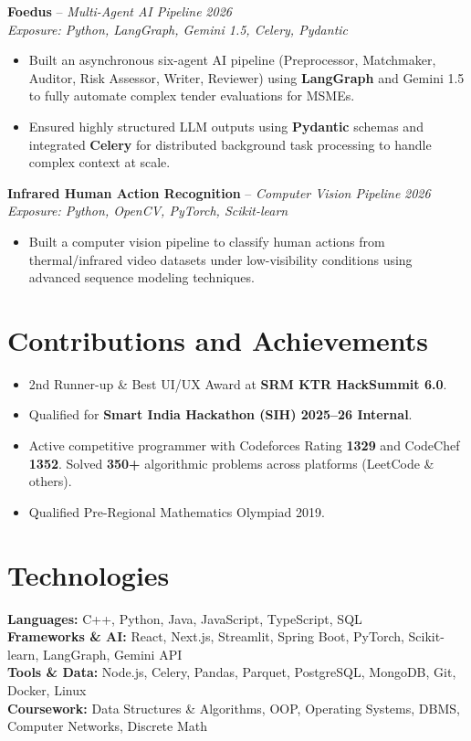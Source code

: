 \documentclass[10pt,a4paper]{article}
\begin{document}
\noindent\textbf{Foedus} -- \textit{Multi-Agent AI Pipeline} \hfill \textit{2026} \\
\textit{Exposure: Python, LangGraph, Gemini 1.5, Celery, Pydantic}
\begin{itemize}
    \item \small Built an asynchronous six-agent AI pipeline (Preprocessor, Matchmaker, Auditor, Risk Assessor, Writer, Reviewer) using \textbf{LangGraph} and Gemini 1.5 to fully automate complex tender evaluations for MSMEs.
    \item \small Ensured highly structured LLM outputs using \textbf{Pydantic} schemas and integrated \textbf{Celery} for distributed background task processing to handle complex context at scale.
\end{itemize}

\noindent\textbf{Infrared Human Action Recognition} -- \textit{Computer Vision Pipeline} \hfill \textit{2026} \\
\textit{Exposure: Python, OpenCV, PyTorch, Scikit-learn}
\begin{itemize}
    \item \small Built a computer vision pipeline to classify human actions from thermal/infrared video datasets under low-visibility conditions using advanced sequence modeling techniques.
\end{itemize}

\section*{Contributions and Achievements}
\begin{itemize}
    \item \small 2nd Runner-up \& Best UI/UX Award at \textbf{SRM KTR HackSummit 6.0}.
    \item \small Qualified for \textbf{Smart India Hackathon (SIH) 2025–26 Internal}.
    \item \small Active competitive programmer with Codeforces Rating \textbf{1329} and CodeChef \textbf{1352}. Solved \textbf{350+} algorithmic problems across platforms (LeetCode \& others).
    \item \small Qualified Pre-Regional Mathematics Olympiad 2019.
\end{itemize}

\section*{Technologies}
\textbf{Languages:} C++, Python, Java, JavaScript, TypeScript, SQL \\
\textbf{Frameworks \& AI:} React, Next.js, Streamlit, Spring Boot, PyTorch, Scikit-learn, LangGraph, Gemini API \\
\textbf{Tools \& Data:} Node.js, Celery, Pandas, Parquet, PostgreSQL, MongoDB, Git, Docker, Linux \\
\textbf{Coursework:} Data Structures \& Algorithms, OOP, Operating Systems, DBMS, Computer Networks, Discrete Math
\end{document}
